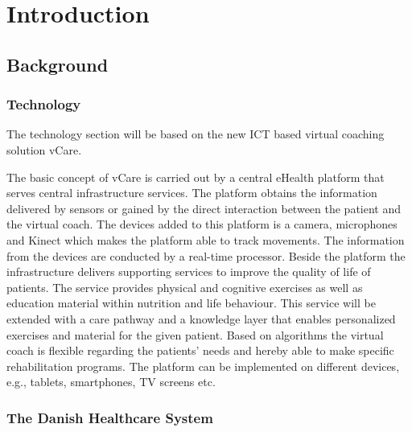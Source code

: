 \chapter{Introduction}

\section{Background}
\subsection{Technology}

The technology section will be based on the new ICT based virtual coaching solution vCare. 

The basic concept of vCare is carried out by a central eHealth platform that serves central infrastructure services. The platform obtains the information delivered by sensors or gained by the direct interaction between the patient and the virtual coach. The devices added to this platform is a camera, microphones and Kinect which makes the platform able to track movements. The information from the devices are conducted by a real-time processor. Beside the platform the infrastructure delivers supporting services to improve the quality of life of patients. The service provides physical and cognitive exercises as well as education material within nutrition and life behaviour. This service will be extended with a care pathway and a knowledge layer that enables personalized exercises and material for the given patient. Based on algorithms the virtual coach is flexible regarding the patients’ needs and hereby able to make specific rehabilitation programs. The platform can be implemented on different devices, e.g., tablets, smartphones, TV screens etc.  


\subsection{The Danish Healthcare System}



